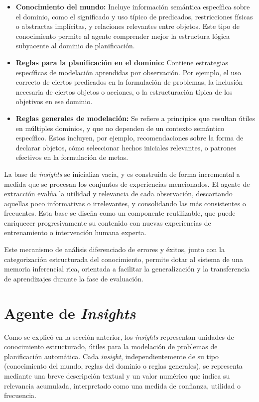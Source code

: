 \begin{itemize}
  \item \textbf{Conocimiento del mundo:} Incluye información semántica específica sobre el dominio, como el significado y uso típico de predicados, restricciones físicas o abstractas implícitas, y relaciones relevantes entre objetos. Este tipo de conocimiento permite al agente comprender mejor la estructura lógica subyacente al dominio de planificación.

  \item \textbf{Reglas para la planificación en el dominio:} Contiene estrategias específicas de modelación aprendidas por observación. Por ejemplo, el uso correcto de ciertos predicados en la formulación de problemas, la inclusión necesaria de ciertos objetos o acciones, o la estructuración típica de los objetivos en ese dominio.

  \item \textbf{Reglas generales de modelación:} Se refiere a principios que resultan útiles en múltiples dominios, y que no dependen de un contexto semántico específico. Estos incluyen, por ejemplo, recomendaciones sobre la forma de declarar objetos, cómo seleccionar hechos iniciales relevantes, o patrones efectivos en la formulación de metas.
\end{itemize}

La base de \textit{insights} se inicializa vacía, y es construida de forma incremental a medida que se procesan los conjuntos de experiencias mencionados. El agente de extracción evalúa la utilidad y relevancia de cada observación, descartando aquellas poco informativas o irrelevantes, y consolidando las más consistentes o frecuentes. Esta base se diseña como un componente reutilizable, que puede enriquecer progresivamente su contenido con nuevas experiencias de entrenamiento o intervención humana experta.

Este mecanismo de análisis diferenciado de errores y éxitos, junto con la categorización estructurada del conocimiento, permite dotar al sistema de una memoria inferencial rica, orientada a facilitar la generalización y la transferencia de aprendizajes durante la fase de evaluación.

\section{Agente de \textit{Insights}}

Como se explicó en la sección anterior, los \textit{insights} representan unidades de conocimiento estructurado, útiles para la modelación de problemas de planificación automática. Cada \textit{insight}, independientemente de su tipo (conocimiento del mundo, reglas del dominio o reglas generales), se representa mediante una breve descripción textual y un valor numérico que indica su relevancia acumulada, interpretado como una medida de confianza, utilidad o frecuencia.

